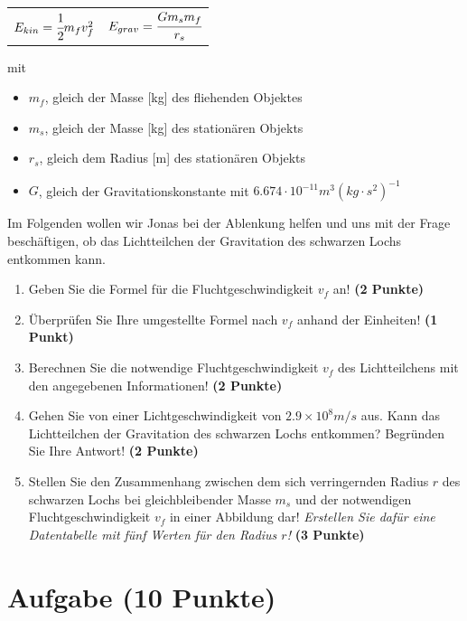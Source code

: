 \documentclass[a4paper, 9pt]{scrartcl}\usepackage[]{graphicx}\usepackage[]{xcolor}
\begin{document}
\begin{center}
  \begin{tabular}{cc}
    $E_{kin} = \cfrac{1}{2}m_fv_f^2$ & $E_{grav} = \cfrac{Gm_sm_f}{r_s}$\\
  \end{tabular}
\end{center}

mit

\begin{itemize}[noitemsep]
\item $m_f$, gleich der Masse [kg] des fliehenden Objektes
\item $m_s$, gleich der Masse [kg] des stationären Objekts
\item $r_s$, gleich dem Radius [m] des stationären Objekts  
\item $G$, gleich der Gravitationskonstante mit $6.674 \cdot 10^{-11} m^3(kg \cdot s^2)^{-1}$ 
\end{itemize}

Im Folgenden wollen wir Jonas bei der Ablenkung helfen und uns mit der Frage beschäftigen, ob das Lichtteilchen der Gravitation des schwarzen Lochs entkommen kann.

\begin{enumerate}
\item Geben Sie die Formel für die Fluchtgeschwindigkeit $v_f$ an! \textbf{(2 Punkte)}
\item Überprüfen Sie Ihre umgestellte Formel nach $v_f$ anhand der Einheiten! \textbf{(1 Punkt)} 
\item Berechnen Sie die notwendige Fluchtgeschwindigkeit $v_f$ des Lichtteilchens mit den angegebenen Informationen! \textbf{(2 Punkte)}
\item Gehen Sie von einer Lichtgeschwindigkeit von $\ensuremath{2.9\times 10^{8}}m/s$ aus. Kann das Lichtteilchen der Gravitation des schwarzen Lochs entkommen? Begründen Sie Ihre Antwort! \textbf{(2 Punkte)}
\item Stellen Sie den Zusammenhang zwischen dem sich verringernden Radius $r$ des schwarzen Lochs bei gleichbleibender Masse $m_s$ und der notwendigen Fluchtgeschwindigkeit $v_f$ in einer Abbildung dar! \textit{Erstellen Sie dafür eine Datentabelle mit fünf Werten für den Radius $r$!} \textbf{(3 Punkte)}
\end{enumerate}

 
\clearpage

\section{Aufgabe \hfill (10 Punkte)}
\end{document}
